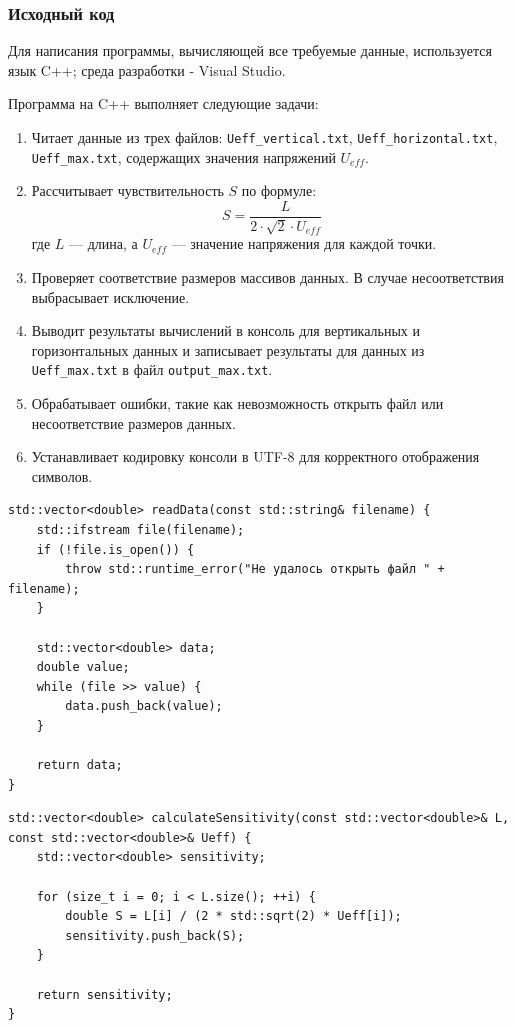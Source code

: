 \subsubsection{Исходный код}
Для написания программы, вычисляющей все требуемые данные, используется язык C++; среда разработки - Visual Studio.

Программа на C++ выполняет следующие задачи:
\begin{enumerate}
    \item Читает данные из трех файлов: \texttt{Ueff\_vertical.txt}, \texttt{Ueff\_horizontal.txt}, \texttt{Ueff\_max.txt}, содержащих значения напряжений \( U_{eff} \).
    \item Рассчитывает чувствительность \( S \) по формуле:
    \[
    S = \frac{L}{2 \cdot \sqrt{2} \cdot U_{eff}}
    \]
    где \( L \) — длина, а \( U_{eff} \) — значение напряжения для каждой точки.
    \item Проверяет соответствие размеров массивов данных. В случае несоответствия выбрасывает исключение.
    \item Выводит результаты вычислений в консоль для вертикальных и горизонтальных данных и записывает результаты для данных из \texttt{Ueff\_max.txt} в файл \texttt{output\_max.txt}.
    \item Обрабатывает ошибки, такие как невозможность открыть файл или несоответствие размеров данных.
    \item Устанавливает кодировку консоли в UTF-8 для корректного отображения символов.
\end{enumerate}

\begin{lstlisting}[label=listing1, caption=Функция считывания данных из файла]
std::vector<double> readData(const std::string& filename) {
    std::ifstream file(filename);
    if (!file.is_open()) {
        throw std::runtime_error("Не удалось открыть файл " + filename);
    }

    std::vector<double> data;
    double value;
    while (file >> value) {
        data.push_back(value);
    }

    return data;
}

\end{lstlisting}

\begin{lstlisting}[label=listing2, caption=Функция расчета чувствительности]
std::vector<double> calculateSensitivity(const std::vector<double>& L, const std::vector<double>& Ueff) {
    std::vector<double> sensitivity;

    for (size_t i = 0; i < L.size(); ++i) {
        double S = L[i] / (2 * std::sqrt(2) * Ueff[i]);
        sensitivity.push_back(S);
    }

    return sensitivity;
}
\end{lstlisting}

